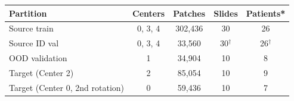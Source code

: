 \footnotesize
\setlength{\tabcolsep}{2.5pt}
\begin{tabular}{lcccc}
\toprule
Partition & Centers & Patches & Slides & Patients* \\
\midrule
Source train & 0, 3, 4 & 302{,}436 & 30 & 26 \\
Source ID val & 0, 3, 4 & 33{,}560 & 30$^\dagger$ & 26$^\dagger$ \\
OOD validation & 1 & 34{,}904 & 10 & 8 \\
Target (Center 2) & 2 & 85{,}054 & 10 & 9 \\
Target (Center 0, 2nd rotation) & 0 & 59{,}436 & 10 & 7 \\
\bottomrule
\end{tabular}

